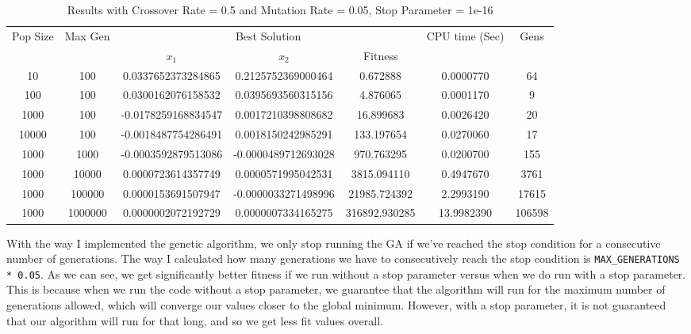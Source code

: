 \documentclass[12pt]{article}
\begin{document}
	\begin{table}[h!]
        \small
		\caption{Results with Crossover Rate = 0.5 and Mutation Rate = 0.05, Stop Parameter = 1e-16}
		\label{table:1}
		\centering
		\begin{tabular}{c c c c c c c}
			\hline
			Pop Size & Max Gen & \multicolumn{3}{c}{Best Solution} & CPU time (Sec) & Gens \\
			& & $x_1$ & $x_2$ & Fitness & \\
			\hline
			10    & 100 & 0.0337652373284865  & 0.2125752369000464  & 0.672888    & 0.0000770 & 64 \\
			100   & 100 & 0.0300162076158532  & 0.0395693560315156  & 4.876065    & 0.0001170 & 9 \\
			1000  & 100 & -0.0178259168834547 & 0.0017210398808682  & 16.899683   & 0.0026420 & 20 \\
			10000 & 100 & -0.0018487754286491 & 0.0018150242985291  & 133.197654  & 0.0270060 & 17 \\
			\hline
			1000 & 1000    & -0.0003592879513086 & -0.0000489712693028 & 970.763295    & 0.0200700 & 155 \\
			1000 & 10000   & 0.0000723614357749  & 0.0000571995042531  & 3815.094110   & 0.4947670 & 3761 \\
			1000 & 100000  & 0.0000153691507947  & -0.0000033271498996 & 21985.724392  & 2.2993190 & 17615 \\
			1000 & 1000000 & 0.0000002072192729  & 0.0000007334165275  & 316892.930285 & 13.9982390 & 106598 \\
			\hline
		\end{tabular}
	\end{table}

    \newpage

    With the way I implemented the genetic algorithm, we only stop running the GA if we've reached the stop condition for a consecutive number of generations. The way I calculated how many generations we have to consecutively reach the stop condition is \verb|MAX_GENERATIONS * 0.05|. As we can see, we get significantly better fitness if we run without a stop parameter versus when we do run with a stop parameter. This is because when we run the code without a stop parameter, we guarantee that the algorithm will run for the maximum number of generations allowed, which will converge our values closer to the global minimum. However, with a stop parameter, it is not guaranteed that our algorithm will run for that long, and so we get less fit values overall.
\end{document}

